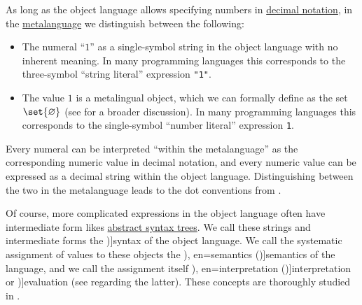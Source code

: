 \begin{concept}\label{con:syntax_and_semantics}
  As long as the object language allows specifying numbers in \hyperref[def:positional_number_system/decimal]{decimal notation}, in the \hyperref[con:metalanguage]{metalanguage} we distinguish between the following:
  \begin{itemize}
    \item The numeral \enquote{\( 1 \)} as a single-symbol string in the object language with no inherent meaning. In many programming languages this corresponds to the three-symbol \enquote{string literal} expression \texttt{"1"}.

    \item The value \( 1 \) is a metalingual object, which we can formally define as the set \( \set{ \varnothing } \) (see  for a broader discussion). In many programming languages this corresponds to the single-symbol \enquote{number literal} expression \texttt{1}.
  \end{itemize}

  Every numeral can be interpreted \enquote{within the metalanguage} as the corresponding numeric value in decimal notation, and every numeric value can be expressed as a decimal string within the object language. Distinguishing between the two in the metalanguage leads to the dot conventions from .

  Of course, more complicated expressions in the object language often have intermediate form likes \hyperref[con:abstract_syntax_tree]{abstract syntax trees}. We call these strings and intermediate forms the \term[en=syntax (\cite[8]{Hinman2005Logic})]{syntax} of the object language. We call the systematic assignment of values to these objects the \term[ru=семантика (\cite[54]{КолмогоровДрагалин2006Логика}), en=semantics (\cite[8]{Hinman2005Logic})]{semantics} of the language, and we call the assignment itself \term[ru=интерпретация (\cite[17]{Герасимов2011Вычислимость}), en=interpretation (\cite[10]{Smullyan1995FOL})]{interpretation} or \term[ru=оценка (\cite[77]{ШеньВерещагин2017Логика})]{evaluation} (see  regarding the latter). These concepts are thoroughly studied in .
\end{concept}


